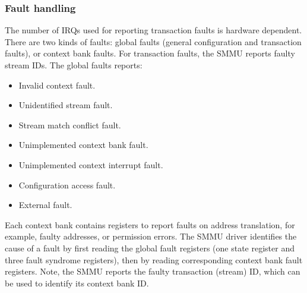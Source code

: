 \subsubsection{Fault handling}
\label{sec:smmuv2-fault-handling}
The number of IRQs used for reporting transaction faults is hardware dependent.
There are two kinds of faults: global faults (general configuration and
transaction faults), or context bank faults. For transaction faults, the SMMU
reports faulty stream IDs. The global faults reports:
\begin{itemize}
    \item Invalid context fault.
    \item Unidentified stream fault.
    \item Stream match conflict fault.
    \item Unimplemented context bank fault.
    \item Unimplemented context interrupt fault.
    \item Configuration access fault.
    \item External fault.
\end{itemize}
Each context bank contains registers to report faults on address translation, for
example, faulty addresses, or permission errors. The SMMU driver identifies the
cause of a fault by first reading the global fault registers (one state register
and three fault syndrome registers), then by reading corresponding context bank
fault registers. Note, the SMMU reports the faulty transaction (stream) ID,
which can be used to identify its context bank ID.

